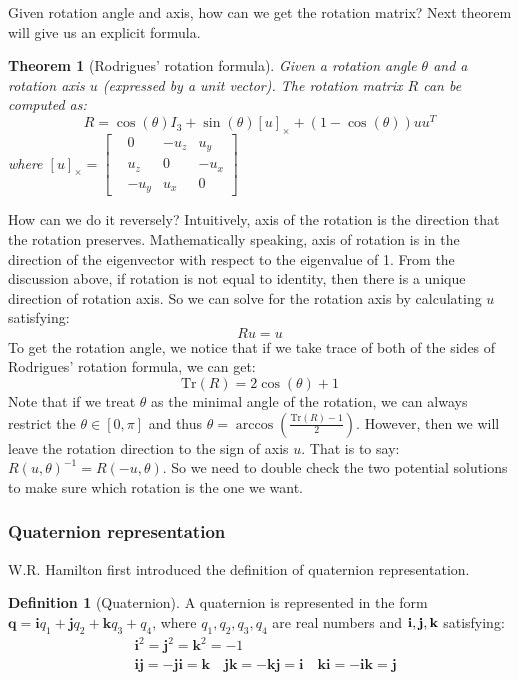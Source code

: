 \documentclass[
]{book}
\newtheorem{theorem}{Theorem}[chapter]
\theoremstyle{definition}
\newtheorem{definition}{Definition}[chapter]
\theoremstyle{definition}
\theoremstyle{definition}
\theoremstyle{definition}
\theoremstyle{remark}
\begin{document}
Given rotation angle and axis, how can we get the rotation matrix? Next theorem will give us an explicit formula.

\begin{theorem}[Rodrigues' rotation formula]
\protect\hypertarget{thm:rodrigues}{}\label{thm:rodrigues}Given a rotation angle \(\theta\) and a rotation axis \(u\) (expressed by a unit vector). The rotation matrix \(R\) can be computed as: \[R = \cos(\theta)I_3+\sin(\theta)[u]_\times+(1-\cos(\theta))uu^T\]
where \([u]_\times = \begin{bmatrix}  &0 &-u_z &u_y\\  &u_z &0 &-u_x\\  &-u_y &u_x &0 \end{bmatrix}\)
\end{theorem}

How can we do it reversely? Intuitively, axis of the rotation is the direction that the rotation preserves. Mathematically speaking, axis of rotation is in the direction of the eigenvector with respect to the eigenvalue of 1. From the discussion above, if rotation is not equal to identity, then there is a unique direction of rotation axis. So we can solve for the rotation axis by calculating \(u\) satisfying:\[Ru = u\] To get the rotation angle, we notice that if we take trace of both of the sides of Rodrigues' rotation formula, we can get:\[\text{Tr}(R) = 2\cos(\theta) + 1\] Note that if we treat \(\theta\) as the minimal angle of the rotation, we can always restrict the \(\theta\in[0,\pi]\) and thus \(\theta = \arccos(\frac{\text{Tr}(R) - 1}{2})\). However, then we will leave the rotation direction to the sign of axis \(u\). That is to say: \(R(u,\theta)^{-1} = R(-u,\theta)\). So we need to double check the two potential solutions to make sure which rotation is the one we want.

\hypertarget{quaternion-representation}{%
\subsubsection{Quaternion representation}\label{quaternion-representation}}

W.R. Hamilton first introduced the definition of quaternion representation.

\begin{definition}[Quaternion]
\protect\hypertarget{def:quaternion}{}\label{def:quaternion}A quaternion is represented in the form \(\textbf{q} = \textbf{i}q_1 + \textbf{j}q_2 + \textbf{k}q_3 + q_4\), where \(q_1,q_2,q_3,q_4\) are real numbers and \(\bf i,j,k\) satisfying:
\begin{align}
  &\textbf{i}^2=\textbf{j}^2=\textbf{k}^2=-1\\
  &\textbf{ij} = -\textbf{ji} = \textbf{k} \quad \textbf{jk} = -\textbf{kj} = \textbf{i} \quad \textbf{ki} = -\textbf{ik} = \textbf{j}
 \end{align}
\end{definition}
\end{document}
